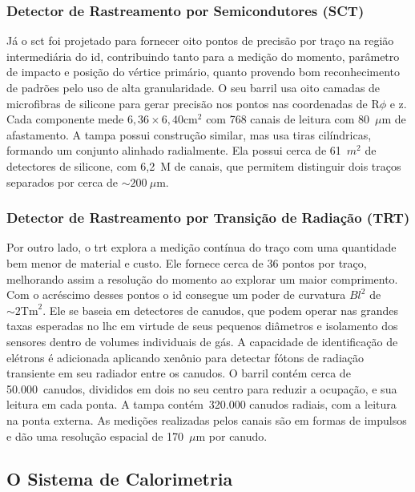 \subsubsection{Detector de Rastreamento por Semicondutores (SCT)}
\label{sssec:sct}

Já o \gls{sct} foi projetado para fornecer oito pontos de precisão por traço na
região intermediária do \gls{id}, contribuindo tanto para a medição do momento,
parâmetro de impacto e posição do vértice primário, quanto provendo bom
reconhecimento de padrões pelo uso de alta granularidade. O seu barril usa oito
camadas de microfibras de silicone para gerar precisão nos pontos nas
coordenadas de R$\phi$ e z. Cada componente mede $6,36\times6,40 \text{cm}^2$ com 768 canais de
leitura com 80~$\mu$m de afastamento. A tampa possui construção similar, mas usa
tiras cilíndricas, formando um conjunto alinhado radialmente. Ela possui cerca de 61~$m^2$ 
de detectores de silicone, com 6,2~M de canais, que permitem distinguir
dois traços separados por cerca de $\sim200~\mu$m.

\subsubsection{Detector de Rastreamento por Transição de Radiação (TRT)}
\label{sssec:trt}

Por outro lado, o \gls{trt} explora a medição contínua do traço com uma
quantidade bem menor de material e custo. Ele fornece cerca de 36 pontos por
traço, melhorando assim a resolução do momento ao explorar um maior
\gls{comprimento}. Com o acréscimo desses pontos o \gls{id} consegue 
um poder de curvatura $Bl^2$ de $\sim2\text{Tm}^2$. 
Ele se baseia em detectores de canudos, que podem operar nas
grandes taxas esperadas no \gls{lhc} em virtude de seus pequenos diâmetros e
isolamento dos sensores dentro de volumes individuais de gás. A capacidade de
identificação de elétrons é adicionada aplicando xenônio para detectar fótons de
radiação transiente em seu radiador entre os canudos. O barril contém cerca de
50.000~canudos, divididos em dois no seu centro para reduzir a ocupação, e sua
leitura em cada ponta. A tampa contém~320.000 canudos radiais, com a leitura na
ponta externa. As medições realizadas pelos canais são em formas de
impulsos e dão uma resolução espacial de 170~$\mu$m por canudo.


\subsection{O Sistema de Calorimetria}
\label{ssec:calorimetria}

